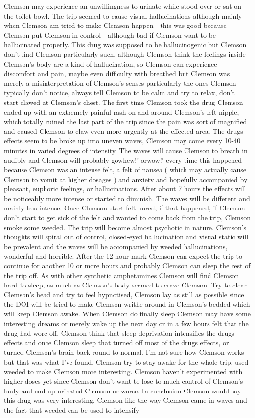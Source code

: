 \documentclass[12pt]{book}
\begin{document}
Clemson may experience an unwillingness to urinate while stood over or sat on the toilet bowl. The trip seemed to cause visual hallucinations although mainly when Clemson am tried to make Clemson happen - this was good because Clemson put Clemson in control - although bad if Clemson want to be hallucinated properly. This drug was supposed to be hallucinogenic but Clemson don't find Clemson particularly such, although Clemson think the feelings inside Clemson's body are a kind of hallucination, so Clemson can experience discomfort and pain, maybe even difficulty with breathed but Clemson was merely a misinterpretation of Clemson's senses particularly the ones Clemson typically don't notice, always tell Clemson to be calm and try to relax, don't start clawed at Clemson's chest. The first time Clemson took the drug Clemson ended up with an extremely painful rash on and around Clemson's left nipple, which totally ruined the last part of the trip since the pain was sort of magnified and caused Clemson to claw even more urgently at the effected area. The drugs effects seem to be broke up into uneven waves, Clemson may come every 10-40 minutes in varied degrees of intensity. The waves will cause Clemson to breath in audibly and Clemson will probably gowhew!' orwow!' every time this happened because Clemson was an intense felt, a felt of nausea ( which may actually cause Clemson to vomit at higher dosages ) and anxiety and hopefully accompanied by pleasant, euphoric feelings, or hallucinations. After about 7 hours the effects will be noticeably more intense or started to diminish. The waves will be different and mainly less intense. Once Clemson start felt bored, if that happened, if Clemson don't start to get sick of the felt and wanted to come back from the trip, Clemson smoke some weeded. The trip will become almost psychotic in nature. Clemson's thoughts will spiral out of control, closed-eyed hallucination and visual static will be prevalent and the waves will be accompanied by weeded hallucinations, wonderful and horrible. After the 12 hour mark Clemson can expect the trip to continue for another 10 or more hours and probably Clemson can sleep the rest of the trip off. As with other synthetic amphetamines Clemson will find Clemson hard to sleep, as much as Clemson's body seemed to crave Clemson. Try to clear Clemson's head and try to feel hypnotised, Clemson lay as still as possible since the DOI will be tried to make Clemson writhe around in Clemson's bedded which will keep Clemson awake. When Clemson do finally sleep Clemson may have some interesting dreams or merely wake up the next day or in a few hours felt that the drug had wore off. Clemson think that sleep deprivation intensifies the drugs effects and once Clemson sleep that turned off most of the drugs effects, or turned Clemson's brain back round to normal. I'm not sure how Clemson works but that was what I've found. Clemson try to stay awake for the whole trip, used weeded to make Clemson more interesting. Clemson haven't experimented with higher doses yet since Clemson don't want to lose to much control of Clemson's body and end up urinated Clemson or worse. In conclusion Clemson would say this drug was very interesting, Clemson like the way Clemson came in waves and the fact that weeded can be used to intensify 
\end{document}
